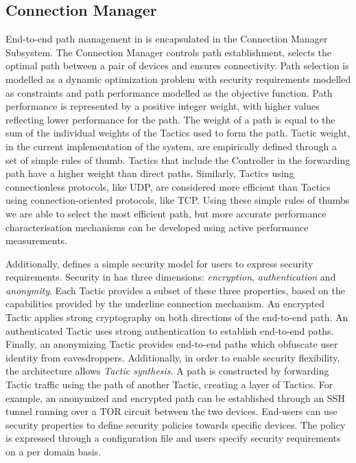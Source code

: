 \subsection{Connection Manager} \label{signpost-engine}

End-to-end path management in \signpost is encapsulated in the Connection
Manager Subsystem.  The Connection Manager controls path establishment, selects
the optimal path between a pair of devices and ensures connectivity.  Path
selection is modelled as a dynamic optimization problem with security
requirements modelled as constraints and path performance modelled as the
objective function.  Path performance is represented by a positive integer
weight, with higher values reflecting lower performance for the path. The weight
of a path is equal to the sum of the individual weights of the Tactics used to
form the path. Tactic weight, in the current implementation of the system, are
empirically defined through a set of simple rules of thumb. Tactics that include
the Controller in the forwarding path have a higher weight than direct paths.
Similarly, Tactics using connectionless protocols, like UDP, are considered more
efficient than Tactics using connection-oriented protocols, like TCP\@.  Using
these simple rules of thumbs we are able to select the most efficient path, but
more accurate performance characterisation mechanisms can be developed using
active performance measurements. 

Additionally, \signpost defines a simple security model for users to express
security requirements. Security in \signpost has three dimensions:
\textit{encryption}, \textit{authentication} and \textit{anonymity}.  Each
Tactic provides a subset of these three properties, based on the capabilities
provided by the underline connection mechanism. An encrypted Tactic applies
strong cryptography on both directions of the end-to-end path. An authenticated
Tactic uses strong authentication to establish end-to-end paths.  Finally, an
anonymizing Tactic provides end-to-end paths which obfuscate user identity from
eavesdroppers.  Additionally, in order to enable security flexibility, the
\signpost architecture allows {\it Tactic synthesis}. A path is constructed by
forwarding Tactic traffic using the path of another Tactic, creating a layer of
Tactics. For example, an anonymized and encrypted path can be established
through an SSH tunnel running over a TOR circuit between the two devices.
End-users can use security properties to define security policies towards
specific devices. The policy is expressed through a configuration file and users
specify security requirements on a per domain basis. 

